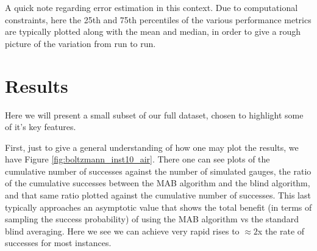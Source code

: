 A quick note regarding error estimation in this context. Due to computational constraints, here the 25th and 75th percentiles of the various performance metrics are typically plotted along with the mean and median, in order to give a rough picture of the variation from run to run.

\section{Results}

Here we will present a small subset of our full dataset, chosen to highlight some of it's key features.

First, just to give a general understanding of how one may plot the results, we have Figure \ref{fig:boltzmann_inst10_air}. There one can see plots of the cumulative number of successes against the number of simulated gauges, the ratio of the cumulative successes between the MAB algorithm and the blind algorithm, and that same ratio plotted against the cumulative number of successes. This last typically approaches an asymptotic value that shows the total benefit (in terms of sampling the success probability) of using the MAB algorithm vs the standard blind averaging. Here we see we can achieve very rapid rises to $\approx 2$x the rate of successes for most instances.

